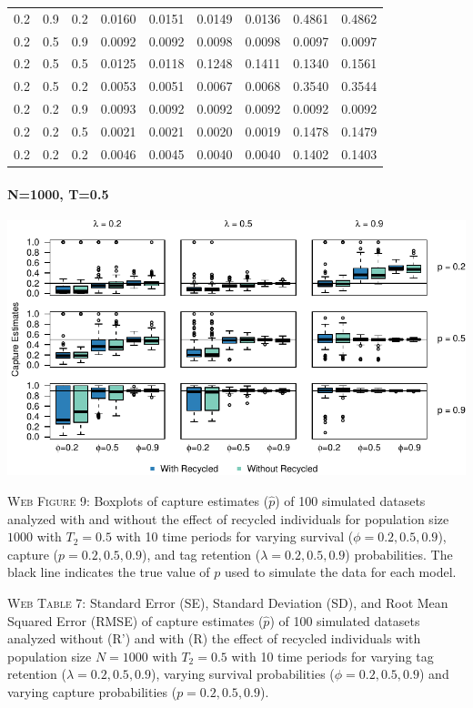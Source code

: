 \documentclass[]{article}
\let\oldparagraph\paragraph
\renewcommand{\paragraph}[1]{\oldparagraph{#1}\mbox{}}
\begin{document}
\begin{table}[ht]
{\begin{tabular}{rrrrrrrrr}
  0.2 & 0.9 & 0.2 & 0.0160 & 0.0151 & 0.0149 & 0.0136 & 0.4861 & 0.4862 \\ 
  0.2 & 0.5 & 0.9 & 0.0092 & 0.0092 & 0.0098 & 0.0098 & 0.0097 & 0.0097 \\ 
  0.2 & 0.5 & 0.5 & 0.0125 & 0.0118 & 0.1248 & 0.1411 & 0.1340 & 0.1561 \\ 
  0.2 & 0.5 & 0.2 & 0.0053 & 0.0051 & 0.0067 & 0.0068 & 0.3540 & 0.3544 \\ 
  0.2 & 0.2 & 0.9 & 0.0093 & 0.0092 & 0.0092 & 0.0092 & 0.0092 & 0.0092 \\ 
  0.2 & 0.2 & 0.5 & 0.0021 & 0.0021 & 0.0020 & 0.0019 & 0.1478 & 0.1479 \\ 
  0.2 & 0.2 & 0.2 & 0.0046 & 0.0045 & 0.0040 & 0.0040 & 0.1402 & 0.1403 \\ 
   \hline
\end{tabular}
}
\endgroup
\end{table}

\newpage

\paragraph{N=1000, T=0.5}\label{n1000-t0.5-1}

\includegraphics{Appendix_files/figure-latex/figure9_capture_GJSTL4-1.pdf}

\textsc{Web Figure 9:} Boxplots of capture estimates (\(\hat{p}\)) of
100 simulated datasets analyzed with and without the effect of recycled
individuals for population size \(1000\) with \(T_2=0.5\) with 10 time
periods for varying survival (\(\phi=0.2,0.5,0.9\)), capture
(\(p=0.2,0.5,0.9\)), and tag retention (\(\lambda=0.2,0.5,0.9\))
probabilities. The black line indicates the true value of \(p\) used to
simulate the data for each model.

\textsc{Web Table 7:} Standard Error (SE), Standard Deviation (SD), and
Root Mean Squared Error (RMSE) of capture estimates (\(\hat{p}\)) of 100
simulated datasets analyzed without (R') and with (R) the effect of
recycled individuals with population size \(N=1000\) with \(T_2=0.5\)
with 10 time periods for varying tag retention
(\(\lambda=0.2,0.5,0.9\)), varying survival probabilities
(\(\phi=0.2,0.5,0.9\)) and varying capture probabilities
(\(p=0.2,0.5,0.9\)).
\end{document}

